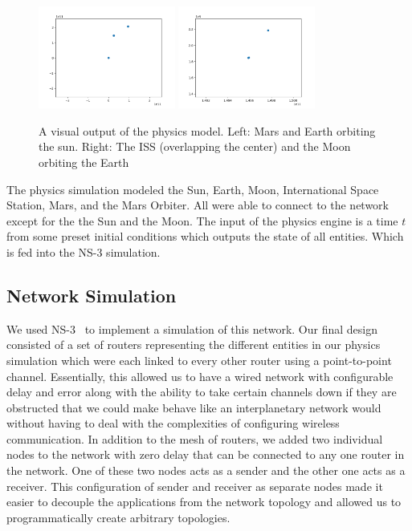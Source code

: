 \documentclass[a4paper,12pt]{article}
\begin{document}
\begin{figure}[h]
  \centering
  \includegraphics[width=0.4\textwidth]{media/sun_orbit.png}
  \includegraphics[width=0.4\textwidth]{media/moon_orbit.png}
  \caption{A visual output of the physics model. Left: Mars and Earth orbiting
    the sun. Right: The ISS (overlapping the center) and the Moon orbiting the
    Earth}
\end{figure}

The physics simulation modeled the Sun, Earth, Moon, International Space
Station, Mars, and the Mars Orbiter. All were able to connect to the network
except for the the Sun and the Moon. The input of the physics engine is a time
$t$ from some preset initial conditions which outputs the state of all entities.
Which is fed into the NS-3 simulation.

\subsection{Network Simulation}

We used NS-3~\cite{ns-3} to implement a simulation of this network. Our final
design consisted of a set of routers representing the different entities in our
physics simulation which were each linked to every other router using a
point-to-point channel. Essentially, this allowed us to have a wired network
with configurable delay and error along with the ability to take certain
channels down if they are obstructed that we could make behave like an
interplanetary network would without having to deal with the complexities of
configuring wireless communication. In addition to the mesh of routers, we added
two individual nodes to the network with zero delay that can be connected to any
one router in the network. One of these two nodes acts as a sender and the other
one acts as a receiver. This configuration of sender and receiver as separate
nodes made it easier to decouple the applications from the network topology and
allowed us to programmatically create arbitrary topologies.
\end{document}
